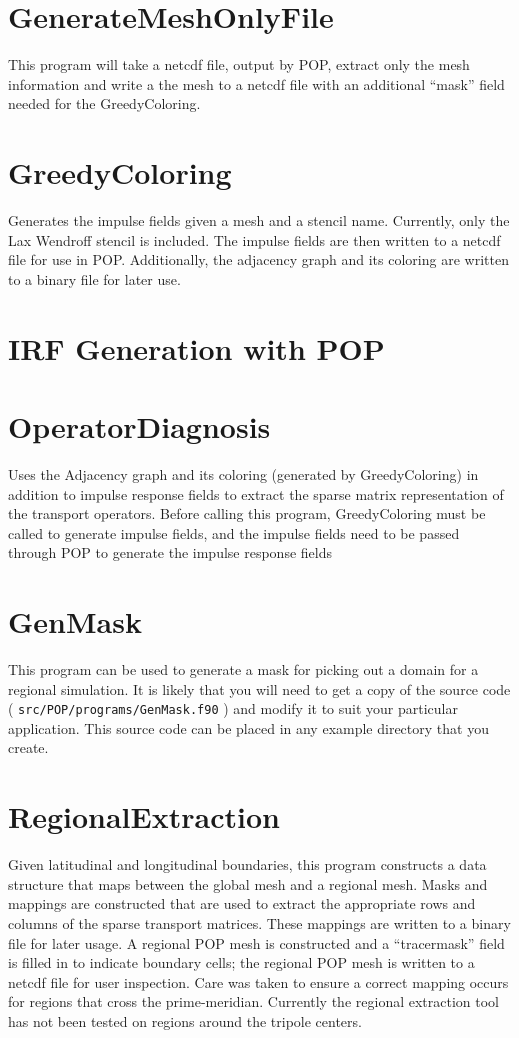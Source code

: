 \documentclass{softwaremanual}
\begin{document}
\section{GenerateMeshOnlyFile}
This program will take a netcdf file, output by POP, extract only the mesh information and write a the mesh to a netcdf file with an additional ``mask'' field needed for the GreedyColoring.

\section{GreedyColoring}
Generates the impulse fields given a mesh and a stencil name. Currently, only the Lax Wendroff stencil is included. The impulse fields are then written to a netcdf file for use in POP. Additionally, the adjacency graph and its coloring are written to a binary file for later use.

\section{IRF Generation with POP}

\section{OperatorDiagnosis}
Uses the Adjacency graph and its coloring (generated by GreedyColoring) in addition to impulse response fields to extract the sparse matrix representation of the transport operators. Before calling this program, GreedyColoring must be called to generate impulse fields, and the impulse fields need to be passed through POP to generate the impulse response fields 


\section{GenMask}
This program can be used to generate a mask for picking out a domain for a regional simulation. It is likely that you will need to get a copy of the source code ( \texttt{src/POP/programs/GenMask.f90} ) and modify it to suit your particular application. This source code can be placed in any example directory that you create.

\section{RegionalExtraction}
Given latitudinal and longitudinal boundaries, this program constructs a data structure that maps between the global mesh and a regional mesh. Masks and mappings are constructed that are used to extract the appropriate rows and columns of the sparse transport matrices. These mappings are written to a binary file for later usage. A regional POP mesh is constructed and a “tracermask” field is filled in to indicate boundary cells; the regional POP mesh is written to a netcdf file for user inspection. Care was taken to ensure a correct mapping occurs for regions that cross the prime-meridian. Currently the regional extraction tool has not been tested on regions around the tripole centers.
\end{document}
